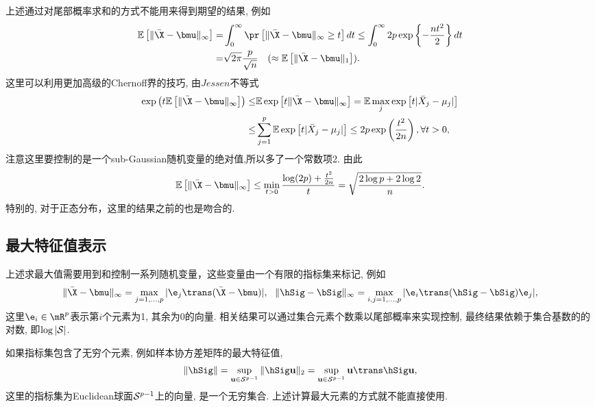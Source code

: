 \begin{exm}
    上述通过对尾部概率求和的方式不能用来得到期望的结果, 例如
    \begin{align*}
      \E \left[ \|\bar{\X}-\bmu\|_\infty \right]=&\int_0^\infty \pr\left[\|\bar{\X}-\bmu\|_\infty \geq t  \right] dt \leq  \int_0^\infty 2p \exp \left\{-\frac{n t^2}{2 }\right\} dt\\
      =& \sqrt{2 \pi} \frac{p}{\sqrt{n}}~~~(\approx  \E \left[ \|\bar{\X}-\bmu\|_1 \right]).
    \end{align*}  
   这里可以利用更加高级的Chernoff界的技巧, 由$Jessen$不等式
   \begin{align*}
      \exp\left( t \E \left[ \|\bar{\X}-\bmu\|_\infty \right]  \right)\leq & \E \exp \left[ t \|\bar{\X}-\bmu\|_\infty   \right]=\E  \max_{j} \exp \left[ t |\bar{X}_j-\mu_j|  \right]\\
      \leq & \sum_{j=1}^p \E \exp \left[ t |\bar{X}_j-\mu_j|   \right]\leq 2 p \exp\left(\frac{t^2}{2n} \right), \forall t>0,
   \end{align*}
 注意这里要控制的是一个sub-Gaussian随机变量的绝对值,所以多了一个常数项2. 由此
   \begin{align*}
      \E \left[ \|\bar{\X}-\bmu\|_\infty \right] \leq \min_{t>0} \frac{\log(2 p)+\frac{t^2}{2n}}{t}=\sqrt{\frac{2\log p+2 \log 2}{n}}.
   \end{align*}
特别的, 对于正态分布，这里的结果之前的也是吻合的.   
  \end{exm}

\subsection{最大特征值表示}
上述求最大值需要用到和控制一系列随机变量，这些变量由一个有限的指标集来标记, 例如
\begin{align*}
    \|\bar{\X}-\bmu\|_\infty=\max_{j=1,\ldots,p} |\e_j \trans (\bar{\X}-\bmu)|,~~\|\hSig-\bSig\|_\infty=\max_{i,j=1,\ldots,p} |\e_i \trans (\hSig-\bSig)\e_j|,
\end{align*}
这里$\e_i \in \mR^p$表示第$i$个元素为1, 其余为0的向量. 相关结果可以通过集合元素个数乘以尾部概率来实现控制, 最终结果依赖于集合基数的的对数, 即$\log |\mathcal{S}|$.


如果指标集包含了无穷个元素, 例如样本协方差矩阵的最大特征值, 
\begin{align*}
    \|\hSig\|=\sup_{\u \in \mS^{p-1}} \|\hSig \u\|_2=\sup_{\u \in \mS^{p-1}} \u \trans \hSig \u,
\end{align*}
这里的指标集为Euclidean球面$\mathcal{S}^{p-1}$上的向量, 是一个无穷集合. 上述计算最大元素的方式就不能直接使用. 



